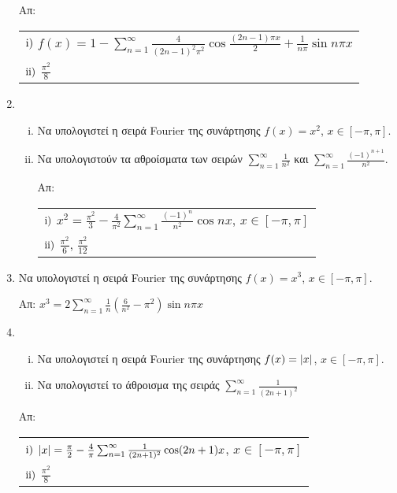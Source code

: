 \begin{enumerate}
    \hfill Απ: 
    \begin{tabular}{l}
      $ \rm i) $ $ f(x) = 1 - \sum_{n=1}^{\infty} \frac{4}{(2n-1)^{2} \pi ^{2}}
      \cos{\frac{(2n-1) \pi x}{2} + \frac{1}{n \pi} \sin{n \pi x}} $ \\
      $ \rm ii) $ $ \frac{\pi ^{2}}{8} $
    \end{tabular}	

  \item
    \begin{enumerate}[i)]
      \item Να υπολογιστεί η σειρά Fourier της συνάρτησης $ f(x)=x^{2} $, 
        $ x \in [- \pi, \pi] $.
      \item Να υπολογιστούν τα αθροίσματα των σειρών $ \sum_{n=1}^{\infty} 
        \frac{1}{n^{2}}  $ και $ \sum_{n=1}^{\infty} \frac{(-1)^{n+1}}{n^{2}}  $.

        \hfill Απ: \begin{tabular}{l} 
          $ \rm i) $ $ x^{2} = \frac{\pi ^{2}}{3} - \frac{4}{\pi ^{2}}\sum_{n=1}^{\infty}
          \frac{(-1)^{n}}{n^{2}} \cos{nx}  $, $ x \in [- \pi, \pi] $ \\
          $ \rm ii) $ $ \frac{\pi ^{2}}{6}  $, $ \frac{\pi ^{2}}{12}  $
        \end{tabular}
    \end{enumerate}

  \item Να υπολογιστεί η σειρά Fourier της συνάρτησης $ f(x)=x^{3} $, 
    $ x \in [- \pi, \pi] $.

    \hfill Απ: $ x^{3} = 2 \sum_{n=1}^{\infty} \frac{1}{n} \left(\frac{6}{n^{2}} - 
    \pi ^{2}\right) \sin{n \pi x} $ 

  \item 
    \begin{enumerate}[i)]
      \item Να υπολογιστεί η σειρά Fourier της συνάρτησης $ f(x)= \abs{x} $, $ x \in
        [- \pi, \pi] $. 
      \item Να υπολογιστεί το άθροισμα της σειράς 
        $ \sum_{n=1}^{\infty} \frac{1}{(2n+1)^{2}} $ 
    \end{enumerate}

    \hfill Απ: \begin{tabular}{l}
      $\rm i)$ $ \abs{x} = \frac{\pi}{2} - \frac{4}{\pi} \sum_{n=1}^{\infty} 
      \frac{1}{(2n+1)^{2}} \cos(2n+1)x  $, $ x \in [- \pi, \pi] $ \\
      $\rm ii)$ $ \frac{\pi ^{2}}{8}$ 
    \end{tabular}


\end{enumerate}
